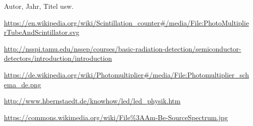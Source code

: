\documentclass[12pt,a4paper,titlepage]{article}
\begin{document}
\begin{thebibliography}{}

 Autor, Jahr, Titel usw.

 \url{https://en.wikipedia.org/wiki/Scintillation_counter#/media/File:PhotoMultiplierTubeAndScintillator.svg}

 \url{http://nsspi.tamu.edu/nssep/courses/basic-radiation-detection/semiconductor-detectors/introduction/introduction}

 \url{https://de.wikipedia.org/wiki/Photomultiplier#/media/File:Photomultiplier_schema_de.png}

 \url{http://www.hbernstaedt.de/knowhow/led/led_physik.htm}

 \url{https://commons.wikimedia.org/wiki/File%3AAm-Be-SourceSpectrum.jpg}

\end{thebibliography}
\end{document}
